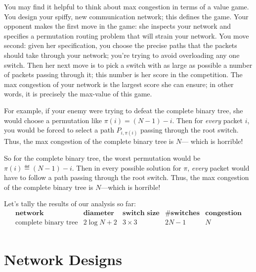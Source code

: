 \begin{editingnotes}

You may find it helpful to think about max congestion in terms of a value
game.  You design your spiffy, new communication network; this defines the
game.  Your opponent makes the first move in the game: she inspects your
network and specifies a permutation routing problem that will strain your
network.\iffalse
That is, her first move is a specification of which input terminals must
send a packet to which output terminals.
\fi
You move second: given her specification, you choose the precise paths
that the packets should take through your network; you're trying to avoid
overloading any one switch.  Then her next move is to pick a switch with
as large as possible a number of packets passing through it; this number
is her score in the competition.  The max congestion of your network is
the largest score she can ensure; in other words, it is precisely the
max-value of this game.

For example, if your enemy were trying to defeat the complete binary
tree, she would choose a permutation like $\pi(i) = (N - 1) - i$.
Then for \textit{every} packet $i$, you would be forced to select a
path $P_{i, \pi(i)}$ passing through the root switch.  Thus, the max
congestion of the complete binary tree is $N$--- which is horrible!

\end{editingnotes}

So for the complete binary tree, the worst permutation would be
$\pi(i) \eqdef (N - 1) - i$.  Then in every possible solution for
$\pi$, \textit{every} packet would have to follow a path passing
through the root switch.  Thus, the max congestion of the complete
binary tree is $N$---which is horrible!

Let's tally the results of our analysis so far:
%
\[
\begin{array}{r|c|c|c|c}
\textbf{network} &
\textbf{diameter} &
\textbf{switch size} &
\textbf{\# switches} &
\textbf{congestion} \\ \hline
\text{complete binary tree} & 2 \log N + 2 & 3 \times 3 & 2N - 1 & N \\
\end{array}
\]

\begin{problems}
\examproblems
{}
\end{problems}

\section{Network Designs}

